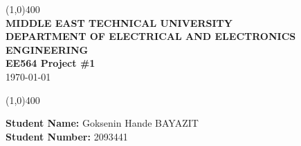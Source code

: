 \documentclass[oneside,12pt]{article}
\begin{document}
\vfill
\begin{titlepage}
\begin{center}
\line(1,0){400}\\
\vspace{2cm}
\LARGE\textbf{MIDDLE EAST TECHNICAL UNIVERSITY}\\
\vspace{0.5cm}
\LARGE\textbf{DEPARTMENT OF ELECTRICAL AND ELECTRONICS ENGINEERING}\\ 

\vspace{1.5cm}
\LARGE\textbf{EE564 Project \#1}\\
\vspace{0.5cm}
\today\\
\vspace{2cm}

\line(1,0){400}\\
\vspace{0.5cm}

\end{center}

\vspace{3cm}
\begin{flushleft}
\LARGE\textbf {Student Name:} Goksenin Hande BAYAZIT\\
\LARGE\textbf {Student Number:} 2093441\\
\end{flushleft}
\end{titlepage}
\newpage
{}



\end{document}
